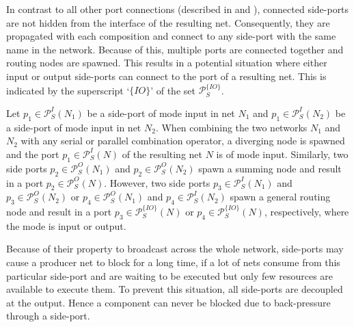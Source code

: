 In contrast to all other port connections (described in \Sect{\ref{sect_smx_nets_self}} and \Sect{\ref{sect_smx_network}}), connected side-ports are not hidden from the interface of the resulting net.
Consequently, they are propagated with each composition and connect to any side-port with the same name in the network.
Because of this, multiple ports are connected together and routing nodes are spawned.
This results in a potential situation where either input or output side-ports can connect to the port of a resulting net.
This is indicated by the superscript `$\{\mathit{IO}\}$' of the set $\mathcal{P}_S^{\{\mathit{IO}\}}$.

Let $p_1 \in \mathcal{P}_S^I(N_1)$ be a side-port of mode input in net $N_1$ and $p_1 \in \mathcal{P}_S^I(N_2)$ be a side-port of mode input in net $N_2$.
When combining the two networks $N_1$ and $N_2$ with any serial or parallel combination operator, a diverging node is spawned and the port $p_{1} \in \mathcal{P}_S^I(N)$ of the resulting net $N$ is of mode input.
Similarly, two side ports $p_2 \in \mathcal{P}_S^O(N_1)$ and $p_2 \in \mathcal{P}_S^O(N_2)$ spawn a summing node and result in a port $p_2 \in \mathcal{P}_S^O(N)$.
However, two side ports $p_3 \in \mathcal{P}_S^I(N_1)$ and $p_3 \in \mathcal{P}_S^O(N_2)$ or $p_4 \in \mathcal{P}_S^O(N_1)$ and $p_4 \in \mathcal{P}_S^I(N_2)$ spawn a general routing node and result in a port $p_3 \in \mathcal{P}_S^{\{\mathit{IO}\}}(N)$ or $p_4 \in \mathcal{P}_S^{\{\mathit{IO}\}}(N)$, respectively, where the mode is input or output.

Because of their property to broadcast across the whole network, side-ports may cause a producer net to block for a long time, \eg if a lot of nets consume from this particular side-port and are waiting to be executed but only few resources are available to execute them.
To prevent this situation, all side-ports are decoupled at the output.
Hence a component can never be blocked due to back-pressure through a side-port.

